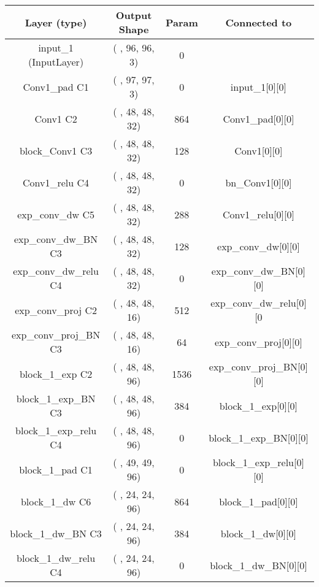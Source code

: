 \documentclass{bmvc2k}
\begin{document}
\begin{table}
\centering
\begin{tabular}{|c|c|c|c|}
\hline

Layer (type)                  &  Output Shape         &Param  &   Connected to                     \\ \hline
input\_1 (InputLayer)            & ( , 96, 96, 3)  &  0      &                                      \\ \hline
Conv1\_pad C1       & ( , 97, 97, 3)  &  0      &     input\_1[0][0]                    \\ \hline
Conv1 C2                  & ( , 48, 48, 32) &  864    &     Conv1\_pad[0][0]                  \\ \hline
block\_Conv1 C3   & ( , 48, 48, 32) &  128    &     Conv1[0][0]                      \\ \hline
Conv1\_relu C4               & ( , 48, 48, 32) &  0      &     bn\_Conv1[0][0]                   \\ \hline
exp\_conv\_dw C5 & ( , 48, 48, 32) &  288    &     Conv1\_relu[0][0]                 \\ \hline
exp\_conv\_dw\_BN C3 & ( , 48, 48, 32) &  128    &     exp\_conv\_dw[0][0]    \\ \hline
exp\_conv\_dw\_relu C4 & ( , 48, 48, 32) &  0      &     exp\_conv\_dw\_BN[0][0] \\ \hline
exp\_conv\_proj C2  & ( , 48, 48, 16) &  512    &     exp\_conv\_dw\_relu[0][0\\ \hline
exp\_conv\_proj\_BN C3 & ( , 48, 48, 16) &  64     &     exp\_conv\_proj[0][0]      \\ \hline
block\_1\_exp C2         & ( , 48, 48, 96) &  1536   &     exp\_conv\_proj\_BN[0][0]   \\ \hline
block\_1\_exp\_BN C3 & ( , 48, 48, 96) &  384    &     block\_1\_exp[0][0]             \\ \hline
block\_1\_exp\_relu C4      & ( , 48, 48, 96) &  0      &     block\_1\_exp\_BN[0][0]          \\ \hline
block\_1\_pad C1     & ( , 49, 49, 96) &  0      &     block\_1\_exp\_relu[0][0]        \\ \hline
block\_1\_dw C6 & ( , 24, 24, 96) &  864    &     block\_1\_pad[0][0]                \\ \hline
block\_1\_dw\_BN C3 & ( , 24, 24, 96) &  384    &     block\_1\_dw[0][0]          \\ \hline
block\_1\_dw\_relu C4   & ( , 24, 24, 96) &  0      &     block\_1\_dw\_BN[0][0]       \\ \hline

\end{tabular}
\end{table}
\end{document}
